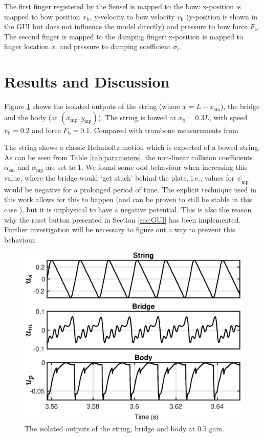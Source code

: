 \documentclass[dvipsnames, pdftex]{article}
\begin{document}
The first finger registered by the Sensel is mapped to the bow: x-position is mapped to bow position $x_\text{b}$, y-velocity to bow velocity $v_\text{b}$ (y-position is shown in the GUI but does not influence the model directly) and pressure to bow force $F_\text{b}$. The second finger is mapped to the damping finger: x-position is mapped to finger location $x_\text{f}$ and pressure to damping coefficient $\sigma_\text{f}$.

\section{Results and Discussion}
Figure \ref{fig:waveforms} shows the isolated outputs of the string (where $x = L-x_\text{sm}$), the bridge and the body (at $(x_\text{mp},y_\text{mp})$). The string is bowed at $x_\text{b} = 0.3L$, with speed $v_\text{b} = 0.2$ and force $F_\text{b} = 0.1$. Compared with trombone measurements from \cite[Figure 6]{Boutin2015:SMC2020} 

The string shows a classic Helmholtz motion which is expected of a bowed string. 
As can be seen from Table \ref{tab:parameters}, the non-linear collision coefficients $\alpha_\text{sm}$ and $\alpha_\text{mp}$ are set to $1$. We found some odd behaviour when increasing this value, where the bridge would `get stuck' behind the plate, i.e., values for $\psi_\text{mp}$ would be negative for a prolonged period of time. The explicit technique used in this work allows for this to happen (and can be proven to still be stable in this case \cite{Ducceschi2019}), but it is unphysical to have a negative potential. This is also the reason why the reset button presented in Section \ref{sec:GUI} has been implemented. Further investigation will be necessary to figure out a way to prevent this behaviour.

\begin{figure}
  \centering
  \includegraphics[width=\columnwidth]{trombaWaveforms.eps}
  \caption{The isolated outputs of the string, bridge and body at 0.5 gain.}
  \label{fig:waveforms}
\end{figure}
\end{document}
